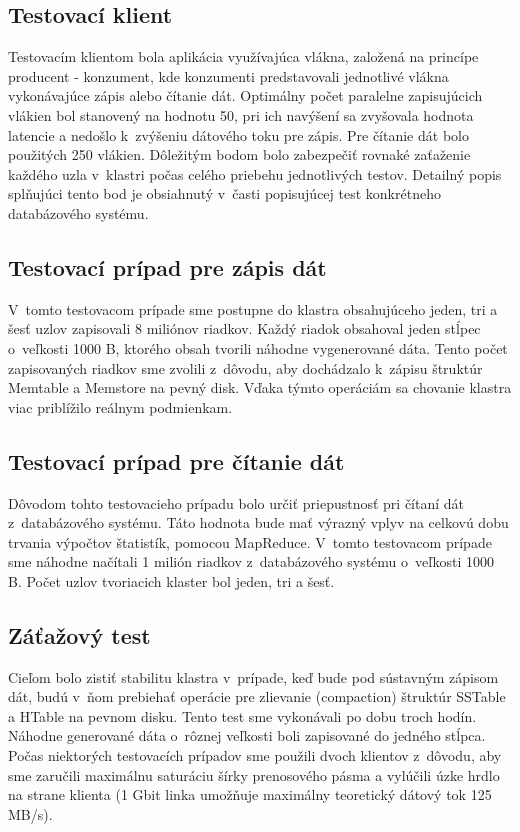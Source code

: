 \documentclass[11pt,twoside,a4paper]{book}
\begin{document}
\subsection{Testovací klient}

Testovacím klientom bola aplikácia využívajúca vlákna, založená na princípe producent - konzument, kde konzumenti predstavovali jednotlivé vlákna vykonávajúce zápis alebo čítanie dát. Optimálny počet paralelne zapisujúcich vlákien bol stanovený na hodnotu 50, pri ich navýšení sa zvyšovala hodnota latencie a nedošlo k~zvýšeniu dátového toku pre zápis. Pre čítanie dát bolo použitých 250 vlákien. Dôležitým bodom bolo zabezpečiť rovnaké zaťaženie každého uzla v~klastri počas celého priebehu jednotlivých testov. Detailný popis splňujúci tento bod je obsiahnutý v~časti popisujúcej test konkrétneho databázového systému.

\subsection{Testovací prípad pre zápis dát}

V~tomto testovacom prípade sme postupne do klastra obsahujúceho jeden, tri a šesť uzlov zapisovali 8 miliónov riadkov. Každý riadok obsahoval jeden stĺpec o~veľkosti 1000 B, ktorého obsah tvorili náhodne vygenerované dáta. Tento počet zapisovaných riadkov sme zvolili z~dôvodu, aby dochádzalo k~zápisu štruktúr Memtable a Memstore na pevný disk. Vďaka týmto operáciám sa chovanie klastra viac priblížilo reálnym podmienkam.

\subsection{Testovací prípad pre čítanie dát}

Dôvodom tohto testovacieho prípadu bolo určiť priepustnosť pri čítaní dát z~databázového systému. Táto hodnota bude mať výrazný vplyv na celkovú dobu trvania výpočtov štatistík, pomocou MapReduce. V~tomto testovacom prípade sme náhodne načítali 1 milión riadkov z~databázového systému o~veľkosti 1000 B. Počet uzlov tvoriacich klaster bol jeden, tri a šesť.

\subsection{Záťažový test}

Cieľom bolo zistiť stabilitu klastra v~prípade, keď bude pod sústavným zápisom dát, budú v~ňom prebiehať  operácie pre zlievanie (compaction) štruktúr SSTable a HTable na pevnom disku. Tento test sme vykonávali po dobu troch hodín. Náhodne generované dáta o~rôznej veľkosti boli zapisované do jedného stĺpca. Počas niektorých testovacích prípadov sme použili dvoch klientov z~dôvodu, aby sme zaručili maximálnu saturáciu šírky prenosového pásma a vylúčili úzke hrdlo na strane klienta (1 Gbit linka umožňuje maximálny teoretický dátový tok 125 MB/s).
\end{document}
